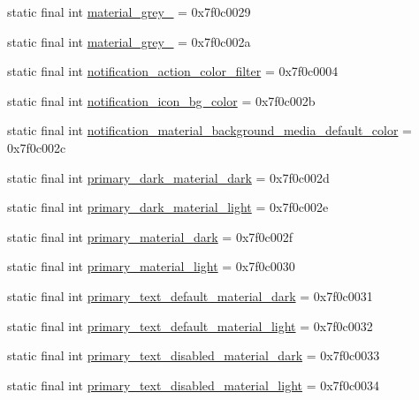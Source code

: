 \begin{CompactItemize}
\item 
static final int \hyperlink{classandroid_1_1support_1_1v4_1_1_r_1_1color_fa8bcefefa3579981c1658e1db4e37d6}{material\_\-grey\_} = 0x7f0c0029
\item 
static final int \hyperlink{classandroid_1_1support_1_1v4_1_1_r_1_1color_1520c27513d7990c0568d2fb8b79da86}{material\_\-grey\_} = 0x7f0c002a
\item 
static final int \hyperlink{classandroid_1_1support_1_1v4_1_1_r_1_1color_57d3179b8e011fff2940a9e09dfd0ba6}{notification\_\-action\_\-color\_\-filter} = 0x7f0c0004
\item 
static final int \hyperlink{classandroid_1_1support_1_1v4_1_1_r_1_1color_bbc29e40fe3c1f97690d4b512563da51}{notification\_\-icon\_\-bg\_\-color} = 0x7f0c002b
\item 
static final int \hyperlink{classandroid_1_1support_1_1v4_1_1_r_1_1color_105973ea71df2187bb6d0583f866c813}{notification\_\-material\_\-background\_\-media\_\-default\_\-color} = 0x7f0c002c
\item 
static final int \hyperlink{classandroid_1_1support_1_1v4_1_1_r_1_1color_b01affa2bf63d64cc209b6be26b58e2e}{primary\_\-dark\_\-material\_\-dark} = 0x7f0c002d
\item 
static final int \hyperlink{classandroid_1_1support_1_1v4_1_1_r_1_1color_e62e524d04c63868c5781bfea29b4c99}{primary\_\-dark\_\-material\_\-light} = 0x7f0c002e
\item 
static final int \hyperlink{classandroid_1_1support_1_1v4_1_1_r_1_1color_2fdef78c6f83e1a1f35fd1bfcffcc8fb}{primary\_\-material\_\-dark} = 0x7f0c002f
\item 
static final int \hyperlink{classandroid_1_1support_1_1v4_1_1_r_1_1color_a321096a05b73165ccbbc5bcd5682b7c}{primary\_\-material\_\-light} = 0x7f0c0030
\item 
static final int \hyperlink{classandroid_1_1support_1_1v4_1_1_r_1_1color_c5b39a6600b60079e8193cdc8fa14c0f}{primary\_\-text\_\-default\_\-material\_\-dark} = 0x7f0c0031
\item 
static final int \hyperlink{classandroid_1_1support_1_1v4_1_1_r_1_1color_375fd655cd0c5840f95d4caec6c2955c}{primary\_\-text\_\-default\_\-material\_\-light} = 0x7f0c0032
\item 
static final int \hyperlink{classandroid_1_1support_1_1v4_1_1_r_1_1color_3f03fcd3a426eb340d9166ad00bf6a96}{primary\_\-text\_\-disabled\_\-material\_\-dark} = 0x7f0c0033
\item 
static final int \hyperlink{classandroid_1_1support_1_1v4_1_1_r_1_1color_4eb78237ed61d67dbf3de61728e041a7}{primary\_\-text\_\-disabled\_\-material\_\-light} = 0x7f0c0034

\end{CompactItemize}
